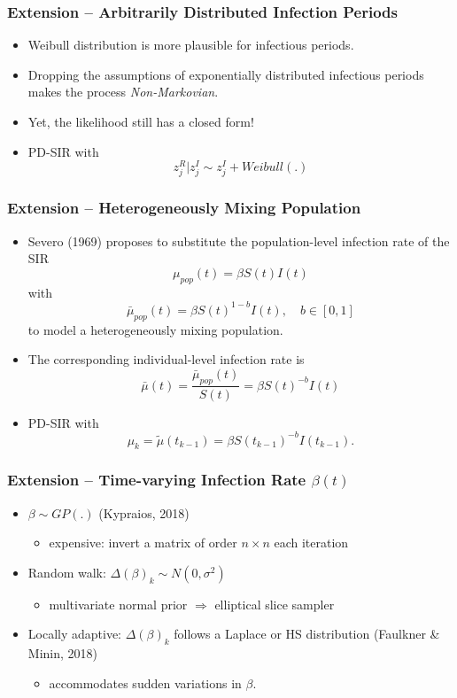 \documentclass{beamer}
\begin{document}
\begin{frame} \frametitle{Extension -- Arbitrarily Distributed Infection Periods}
	
	\begin{itemize}
		\item Weibull distribution is more plausible for infectious periods.
		\item Dropping the assumptions of exponentially distributed infectious periods makes the process \textit{Non-Markovian}.
		\item Yet, the likelihood still has a closed form!
		\item PD-SIR with
		$$z^R_j | z^I_j \sim z^I_j + Weibull(.)$$
	\end{itemize} 
	
\end{frame}


\begin{frame} \frametitle{Extension -- Heterogeneously Mixing Population}
	
	\begin{itemize}
		\item Severo (1969) proposes to substitute the population-level infection rate of the SIR
		$$\mu_{pop}(t) =  \beta S(t) I(t)$$
		with 
		$$\bar{\mu}_{pop}(t) = \beta S(t)^{1-b} I(t), \quad b \in [0,1]$$
		to model a heterogeneously mixing population.
		\item The corresponding individual-level infection rate is 
		$$\bar{\mu}(t) = \dfrac{\bar{\mu}_{pop}(t)}{S(t)} = \beta S(t)^{-b} I(t)$$
		\item PD-SIR with
		$$\mu_k = \tilde{\mu}(t_{k-1}) = \beta S(t_{k-1})^{-b} I(t_{k-1}).$$
	\end{itemize} 
	
\end{frame}

\begin{frame} \frametitle{Extension -- Time-varying Infection Rate $\beta(t)$}
	
	\begin{itemize}
		\item $\beta \sim GP(.)$ (Kypraios, 2018)
		\begin{itemize}
			\item expensive: invert a matrix of order $n\times n$ each iteration
		\end{itemize}
		\item Random walk: $\Delta(\beta)_k \sim N(0, \sigma^2)$
		\begin{itemize}
			\item multivariate normal prior $\Rightarrow$ elliptical slice sampler
		\end{itemize}
		\item Locally adaptive: $\Delta(\beta)_k$ follows a Laplace or HS distribution (Faulkner \& Minin, 2018)
		\begin{itemize}
			\item accommodates sudden variations in $\beta$.
		\end{itemize}
		
	\end{itemize} 
	
\end{frame}
\end{document}
